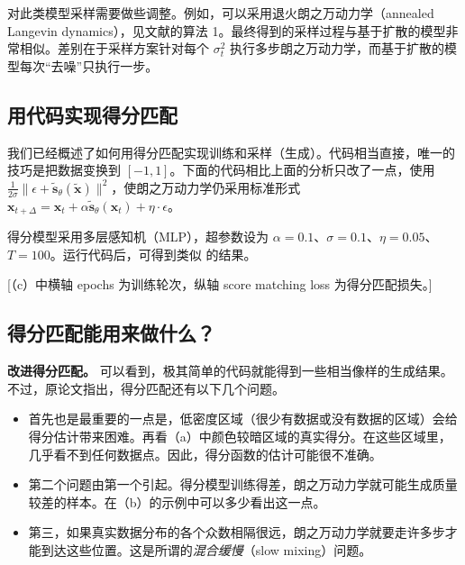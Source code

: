 对此类模型采样需要做些调整。例如，可以采用退火朗之万动力学（annealed Langevin dynamics），见文献的算法 1。最终得到的采样过程与基于扩散的模型非常相似。差别在于采样方案针对每个 $\sigma_t^2$ 执行多步朗之万动力学，而基于扩散的模型每次“去噪”只执行一步。

\subsection{用代码实现得分匹配}

我们已经概述了如何用得分匹配实现训练和采样（生成）。代码相当直接，唯一的技巧是把数据变换到 $[-1,1]$。下面的代码相比上面的分析只改了一点，使用 $\frac{1}{2\sigma}\lVert\epsilon+\tilde{\mathbf s}_\theta(\tilde{\mathbf x})\rVert^2$，使朗之万动力学仍采用标准形式 $\mathbf x_{t+\Delta}=\mathbf x_t+\alpha\tilde{\mathbf s}_\theta(\mathbf x_t)+\eta\cdot\epsilon$。


得分模型采用多层感知机（MLP），超参数设为 $\alpha=0.1$、$\sigma=0.1$、$\eta=0.05$、$T=100$。运行代码后，可得到类似 的结果。

[（c）中横轴 epochs 为训练轮次，纵轴 score matching loss 为得分匹配损失。]

\subsection{得分匹配能用来做什么？}

\textbf{改进得分匹配。} 可以看到，极其简单的代码就能得到一些相当像样的生成结果。不过，原论文指出，得分匹配还有以下几个问题。
\begin{itemize}
  \item 首先也是最重要的一点是，低密度区域（很少有数据或没有数据的区域）会给得分估计带来困难。再看（a）中颜色较暗区域的真实得分。在这些区域里，几乎看不到任何数据点。因此，得分函数的估计可能很不准确。
  \item 第二个问题由第一个引起。得分模型训练得差，朗之万动力学就可能生成质量较差的样本。在（b）的示例中可以多少看出这一点。
  \item 第三，如果真实数据分布的各个众数相隔很远，朗之万动力学就要走许多步才能到达这些位置。这是所谓的\emph{混合缓慢}（slow mixing）问题。
\end{itemize}

